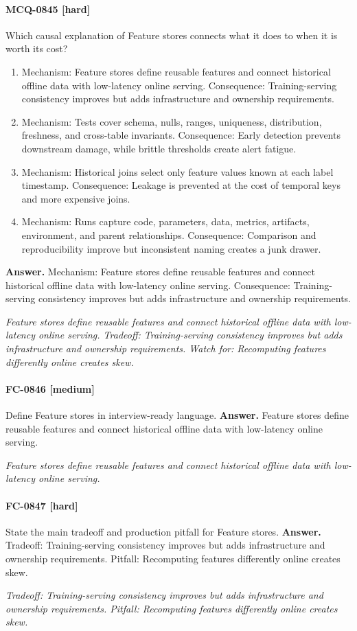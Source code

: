 \paragraph{MCQ-0845 [hard]} Which causal explanation of Feature stores connects what it does to when it is worth its cost?
\begin{enumerate}[label=\Alph*.]
\item Mechanism: Feature stores define reusable features and connect historical offline data with low-latency online serving. Consequence: Training-serving consistency improves but adds infrastructure and ownership requirements.
\item Mechanism: Tests cover schema, nulls, ranges, uniqueness, distribution, freshness, and cross-table invariants. Consequence: Early detection prevents downstream damage, while brittle thresholds create alert fatigue.
\item Mechanism: Historical joins select only feature values known at each label timestamp. Consequence: Leakage is prevented at the cost of temporal keys and more expensive joins.
\item Mechanism: Runs capture code, parameters, data, metrics, artifacts, environment, and parent relationships. Consequence: Comparison and reproducibility improve but inconsistent naming creates a junk drawer.
\end{enumerate}
\noindent\textbf{Answer.} Mechanism: Feature stores define reusable features and connect historical offline data with low-latency online serving. Consequence: Training-serving consistency improves but adds infrastructure and ownership requirements.
\par\textit{Feature stores define reusable features and connect historical offline data with low-latency online serving. Tradeoff: Training-serving consistency improves but adds infrastructure and ownership requirements. Watch for: Recomputing features differently online creates skew.}
\paragraph{FC-0846 [medium]} Define Feature stores in interview-ready language.
\noindent\textbf{Answer.} Feature stores define reusable features and connect historical offline data with low-latency online serving.
\par\textit{Feature stores define reusable features and connect historical offline data with low-latency online serving.}
\paragraph{FC-0847 [hard]} State the main tradeoff and production pitfall for Feature stores.
\noindent\textbf{Answer.} Tradeoff: Training-serving consistency improves but adds infrastructure and ownership requirements. Pitfall: Recomputing features differently online creates skew.
\par\textit{Tradeoff: Training-serving consistency improves but adds infrastructure and ownership requirements. Pitfall: Recomputing features differently online creates skew.}
